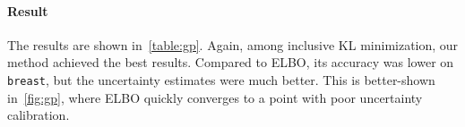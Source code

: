 \paragraph{Result}
The results are shown in~\cref{table:gp}.
Again, among inclusive KL minimization, our method achieved the best results.
Compared to ELBO, its accuracy was lower on \texttt{breast}, but the uncertainty estimates were much better.
This is better-shown in~\cref{fig:gp}, where ELBO quickly converges to a point with poor uncertainty calibration.

%
  \vspace{-0.2in}
